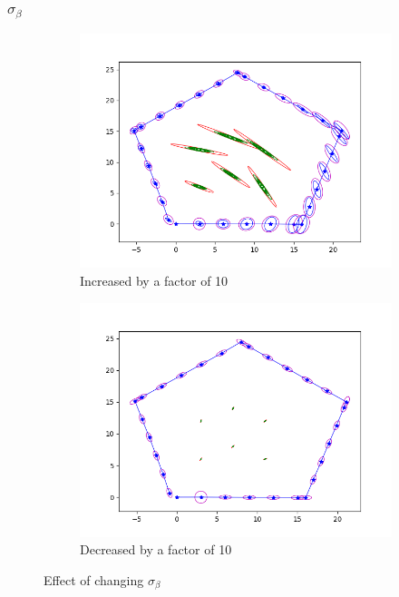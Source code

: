 \documentclass[12pt, a4paper]{article}
\begin{document}
\subsubsection{$\sigma_{\beta}$}
\begin{figure}[H]
  \centering
  \begin{subfigure}[b]{0.45\linewidth}
    \includegraphics[width=\linewidth]{./results/q3_2/result_beta.png}
    \caption{Increased by a factor of 10}
  \end{subfigure}
  \hspace{0.5cm}
  \begin{subfigure}[b]{0.45\linewidth}
    \includegraphics[width=\linewidth]{./results/q3_2/result_beta_dec.png}
    \caption{Decreased by a factor of 10}
  \end{subfigure}
  \caption{Effect of changing $\sigma_{\beta}$}
\end{figure}
\end{document}
